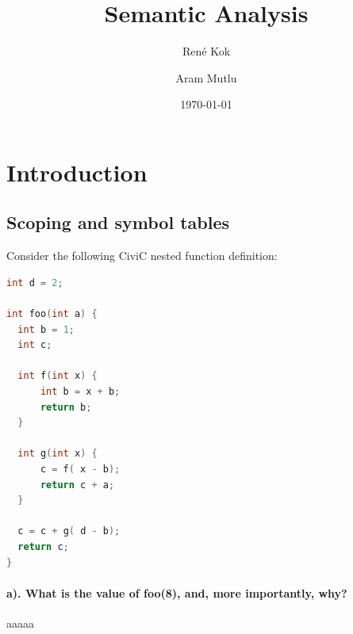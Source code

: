\documentclass[hidelinks]{uva-inf-article}
\title{Semantic Analysis}
\author{René Kok}
\author{Aram Mutlu}
\date{\today}
\begin{document}
\maketitle


\section{Introduction}
\begin{flushleft}
\newpage
\section{Scoping and symbol tables}
Consider the following CiviC nested function definition:
\begin{lstlisting}[basicstyle=\small, language=C]
int d = 2;

int foo(int a) {
  int b = 1; 
  int c;

  int f(int x) { 
      int b = x + b;
      return b; 
  }

  int g(int x) { 
      c = f( x - b); 
      return c + a;
  }
    
  c = c + g( d - b); 
  return c;
}
\end{lstlisting}
\paragraph{a). What is the value of foo(8), and, more importantly, why?\\}
aaaaa

\newpage

\end{flushleft}
\end{document}
